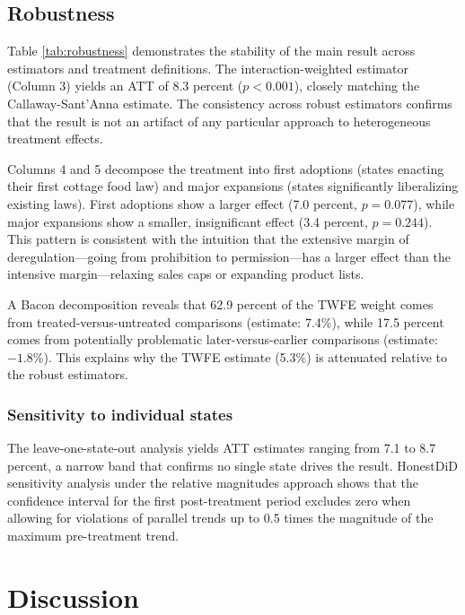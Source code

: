 \documentclass[12pt]{article}
\begin{document}
\subsection{Robustness}



Table \ref{tab:robustness} demonstrates the stability of the main result across estimators and treatment definitions. The \citet{sun2021estimating} interaction-weighted estimator (Column 3) yields an ATT of 8.3 percent ($p < 0.001$), closely matching the Callaway-Sant'Anna estimate. The consistency across robust estimators confirms that the result is not an artifact of any particular approach to heterogeneous treatment effects.

Columns 4 and 5 decompose the treatment into first adoptions (states enacting their first cottage food law) and major expansions (states significantly liberalizing existing laws). First adoptions show a larger effect (7.0 percent, $p = 0.077$), while major expansions show a smaller, insignificant effect (3.4 percent, $p = 0.244$). This pattern is consistent with the intuition that the extensive margin of deregulation---going from prohibition to permission---has a larger effect than the intensive margin---relaxing sales caps or expanding product lists.

A Bacon decomposition reveals that 62.9 percent of the TWFE weight comes from treated-versus-untreated comparisons (estimate: 7.4\%), while 17.5 percent comes from potentially problematic later-versus-earlier comparisons (estimate: $-1.8$\%). This explains why the TWFE estimate (5.3\%) is attenuated relative to the robust estimators.

\subsubsection*{Sensitivity to individual states} The leave-one-state-out analysis yields ATT estimates ranging from 7.1 to 8.7 percent, a narrow band that confirms no single state drives the result. HonestDiD sensitivity analysis \citep{rambachan2023more} under the relative magnitudes approach shows that the confidence interval for the first post-treatment period excludes zero when allowing for violations of parallel trends up to 0.5 times the magnitude of the maximum pre-treatment trend.


\section{Discussion}
\end{document}
